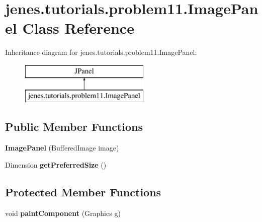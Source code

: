 \hypertarget{classjenes_1_1tutorials_1_1problem11_1_1_image_panel}{\section{jenes.\-tutorials.\-problem11.\-Image\-Panel Class Reference}
\label{classjenes_1_1tutorials_1_1problem11_1_1_image_panel}
}
Inheritance diagram for jenes.\-tutorials.\-problem11.\-Image\-Panel\-:\begin{figure}[H]
\begin{center}
\leavevmode
\includegraphics[height=2.000000cm]{classjenes_1_1tutorials_1_1problem11_1_1_image_panel}
\end{center}
\end{figure}
\subsection*{Public Member Functions}
\begin{DoxyCompactItemize}
\item 
\hypertarget{classjenes_1_1tutorials_1_1problem11_1_1_image_panel_a72e9d512f6d00f9ab6fd18bf052f35fd}{{\bfseries Image\-Panel} (Buffered\-Image image)}\label{classjenes_1_1tutorials_1_1problem11_1_1_image_panel_a72e9d512f6d00f9ab6fd18bf052f35fd}

\item 
\hypertarget{classjenes_1_1tutorials_1_1problem11_1_1_image_panel_afa537b7985f0ccfc8ad9896df39595c7}{Dimension {\bfseries get\-Preferred\-Size} ()}\label{classjenes_1_1tutorials_1_1problem11_1_1_image_panel_afa537b7985f0ccfc8ad9896df39595c7}

\end{DoxyCompactItemize}
\subsection*{Protected Member Functions}
\begin{DoxyCompactItemize}
\item 
\hypertarget{classjenes_1_1tutorials_1_1problem11_1_1_image_panel_a734663d1d6aeb4f2e02e788db04a1444}{void {\bfseries paint\-Component} (Graphics g)}\label{classjenes_1_1tutorials_1_1problem11_1_1_image_panel_a734663d1d6aeb4f2e02e788db04a1444}

\end{DoxyCompactItemize}


